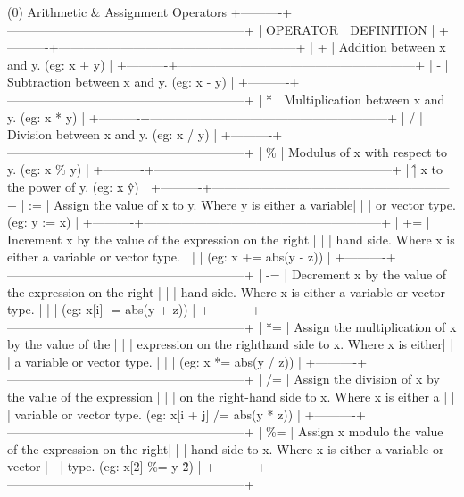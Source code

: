 (0) Arithmetic \& Assignment Operators
+----------+---------------------------------------------------------+
| OPERATOR | DEFINITION                                              |
+----------+---------------------------------------------------------+
|  +       | Addition between x and y.  (eg: x + y)                  |
+----------+---------------------------------------------------------+
|  -       | Subtraction between x and y.  (eg: x - y)               |
+----------+---------------------------------------------------------+
|  *       | Multiplication between x and y.  (eg: x * y)            |
+----------+---------------------------------------------------------+
|  /       | Division between x and y.  (eg: x / y)                  |
+----------+---------------------------------------------------------+
|  \%       | Modulus of x with respect to y.  (eg: x \% y)            |
+----------+---------------------------------------------------------+
|  \^       | x to the power of y.  (eg: x \^ y)                       |
+----------+---------------------------------------------------------+
|  :=      | Assign the value of x to y. Where y is either a variable|
|          | or vector type.  (eg: y := x)                           |
+----------+---------------------------------------------------------+
|  +=      | Increment x by the value of the expression on the right |
|          | hand side. Where x is either a variable or vector type. |
|          | (eg: x += abs(y - z))                                   |
+----------+---------------------------------------------------------+
|  -=      | Decrement x by the value of the expression on the right |
|          | hand side. Where x is either a variable or vector type. |
|          | (eg: x[i] -= abs(y + z))                                |
+----------+---------------------------------------------------------+
|  *=      | Assign the multiplication of x by the value of the      |
|          | expression on the righthand side to x. Where x is either|
|          | a variable or vector type.                              |
|          | (eg: x *= abs(y / z))                                   |
+----------+---------------------------------------------------------+
|  /=      | Assign the division of x by the value of the expression |
|          | on the right-hand side to x. Where x is either a        |
|          | variable or vector type.  (eg: x[i + j] /= abs(y * z))  |
+----------+---------------------------------------------------------+
|  \%=      | Assign x modulo the value of the expression on the right|
|          | hand side to x. Where x is either a variable or vector  |
|          | type.  (eg: x[2] \%= y \^ 2)                              |
+----------+---------------------------------------------------------+

